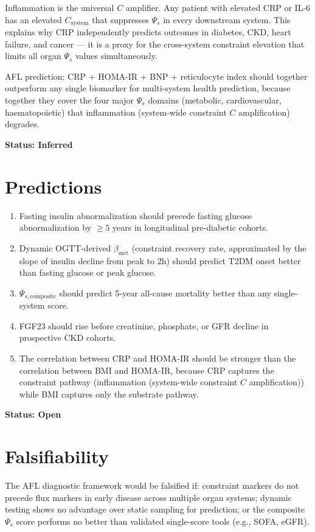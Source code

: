 \documentclass[12pt,a4paper]{article}
\begin{document}
Inflammation is the universal $C$ amplifier. Any patient with elevated CRP or IL-6 has an elevated $C_{\mathrm{system}}$ that suppresses $\Psi_s$ in every downstream system. This explains why CRP independently predicts outcomes in diabetes, CKD, heart failure, and cancer --- it is a proxy for the cross-system constraint elevation that limits all organ $\Psi_s$ values simultaneously.

AFL prediction: CRP + HOMA-IR + BNP + reticulocyte index should together outperform any single biomarker for multi-system health prediction, because together they cover the four major $\Psi_s$ domains (metabolic, cardiovascular, haematopoietic) that inflammation (system-wide constraint $C$ amplification) degrades.

\textbf{Status: Inferred}

\section{Predictions}

\begin{enumerate}
    \item Fasting insulin abnormalization should precede fasting glucose abnormalization by $\geq 5$ years in longitudinal pre-diabetic cohorts.
    \item Dynamic OGTT-derived $\beta_{\mathrm{met}}$ (constraint recovery rate, approximated by the slope of insulin decline from peak to 2h) should predict T2DM onset better than fasting glucose or peak glucose.
    \item $\Psi_{s,\mathrm{composite}}$ should predict 5-year all-cause mortality better than any single-system score.
    \item FGF23 should rise before creatinine, phosphate, or GFR decline in prospective CKD cohorts.
    \item The correlation between CRP and HOMA-IR should be stronger than the correlation between BMI and HOMA-IR, because CRP captures the constraint pathway (inflammation (system-wide constraint $C$ amplification)) while BMI captures only the substrate pathway.
\end{enumerate}

\textbf{Status: Open}

\section{Falsifiability}

The AFL diagnostic framework would be falsified if: constraint markers do not precede flux markers in early disease across multiple organ systems; dynamic testing shows no advantage over static sampling for prediction; or the composite $\Psi_s$ score performs no better than validated single-score tools (e.g., SOFA, eGFR).
\end{document}
